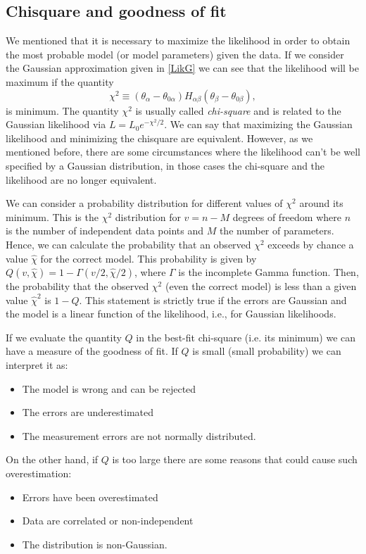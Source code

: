 \documentclass[onecolumn,           %
               showpacs,            %
               preprintnumbers,     %
               aps,                 %
               prl,          	    %
               letterpaper,             %
               superscriptaddress,      %
               nofootinbib,         %
               tightenlines,        %
               floats,floatfix      %
               ,usenatbib,
               ]{revtex4-1}
\begin{document}
\subsection{Chisquare and goodness of fit}

We mentioned that it is necessary to maximize the likelihood in order to obtain the most probable model (or model parameters) given the data. If we consider the Gaussian approximation given in \eqref{LikG} we can see that the likelihood will be maximum if the quantity
\begin{equation}\label{chi2}
\chi^2\equiv(\theta_\alpha-\theta_{0\alpha})H_{\alpha\beta}(\theta_\beta-\theta_{0\beta}),
\end{equation}
is minimum. The quantity $\chi^2$ is usually called \textit{chi-square} and is related to the Gaussian likelihood via $L=L_0e^{-\chi^2/2}$. We can say that maximizing the Gaussian likelihood and minimizing the chisquare are equivalent. However, as we mentioned before, there are some circumstances where the likelihood can't be well specified by a Gaussian distribution, in those cases the chi-square and the likelihood are no longer equivalent. 

We can consider a probability distribution for different values of $\chi^2$ around its minimum. This is the $\chi^2$ distribution for $v=n-M$ degrees of freedom where $n$ is the number of independent data points and $M$ the number of parameters. Hence, we can calculate the probability that an observed $\chi^2$ exceeds by chance a value $\hat \chi$ for the correct model. This probability is given by \cite{NR} $Q(v,\hat\chi)=1-\Gamma(v/2,\hat\chi/2)$, where $\Gamma$ is the incomplete Gamma function. Then, the probability that the observed $\chi^2$ (even the correct model) is less than a given value $\hat\chi^2$ is $1-Q$. This statement is strictly true if the errors are Gaussian and the model is a linear function of the likelihood, i.e., for Gaussian likelihoods.

If we evaluate the quantity $Q$ in the best-fit chi-square (i.e. its minimum) we can have a measure of the goodness of fit. If $Q$ is small (small probability) we can interpret it as:
\begin{itemize}
\item The model is wrong and can be rejected
\item The errors are underestimated 
\item The measurement errors are not normally distributed.
\end{itemize}
On the other hand, if $Q$ is too large there are some reasons that could cause such overestimation:
\begin{itemize}
\item Errors have been overestimated
\item Data are correlated or non-independent
\item The distribution is non-Gaussian.
\end{itemize}
\end{document}
